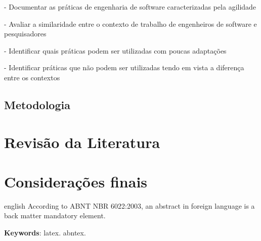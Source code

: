 \documentclass[
	article,			%
	11pt,				%
	oneside,			%
	a4paper,			%
	english,			%
	brazil,				%
	sumario=tradicional
	]{abntex2}
\begin{document}
- Documentar as práticas de engenharia de software caracterizadas pela agilidade

- Avaliar a similaridade entre o contexto de trabalho de engenheiros de software e pesquisadores

- Identificar quais práticas podem ser utilizadas com poucas adaptações

- Identificar práticas que não podem ser utilizadas tendo em vista a diferença entre os contextos

\subsection*{Metodologia}

\section*{Revisão da Literatura}

% 

\section*{Considerações finais}

\postextual



\emptythanks
\maketitle

\renewcommand{\resumoname}{Abstract}
\begin{resumoumacoluna}
 \begin{otherlanguage*}{english}
   According to ABNT NBR 6022:2003, an abstract in foreign language is a back
   matter mandatory element.

   \vspace{\onelineskip}
 
   \noindent
   \textbf{Keywords}: latex. abntex.
 \end{otherlanguage*}  
\end{resumoumacoluna}
\end{document}
